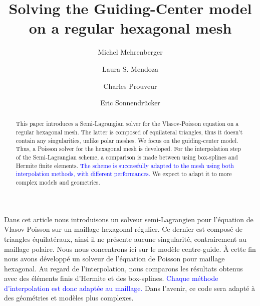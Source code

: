 \documentclass[proc]{edpsmath}
\begin{document}

\title{Solving the Guiding-Center model\\on a regular hexagonal mesh}%
%
\author{Michel Mehrenberger} \address{IRMA, Universit\'e de Strasbourg, 7, rue Ren\'e Descartes, 67084 Strasbourg \& INRIA-Nancy Grand-Est, projet TONUS, 
}
\author{Laura S. Mendoza} \address{Max-Planck-Institut f\"{u}r Plasmaphysik, Boltzmannstr. 2, D-85748 Garching bei M\"unchen, Germany. } 
\author{Charles Prouveur}\address{Universit\'e de Lyon, UMR5208, Institut Camille Jordan,
43 boulevard 11 novembre 1918, F-69622 Villeurbanne cedex,  FRANCE}
\author{Eric Sonnendr\"{u}cker}
%
%


\begin{abstract} 
This paper introduces a Semi-Lagrangian solver for the Vlasov-Poisson equation on a regular hexagonal mesh. The latter is composed of equilateral triangles, thus it doesn't contain any singularities, unlike polar meshes. We focus on the guiding-center model. Thus, a Poisson solver for the hexagonal mesh is developed. For the interpolation step of the Semi-Lagrangian scheme, a comparison is made between using box-splines and Hermite finite elements. \textcolor{blue}{The scheme is successfully adapted to the mesh using both interpolation methods, with different performances.} We expect to adapt it to more complex models and geometries.
\end{abstract}

\begin{resume} 
Dans cet article nous introduisons un solveur semi-Lagrangien pour l'\'equation de Vlasov-Poisson sur un maillage hexagonal r\'egulier. Ce dernier est compos\'e de triangles \'equilat\'eraux, ainsi il ne pr\'esente aucune singularit\'e, contrairement au maillage polaire. Nous nous concentrons ici sur le mod\`ele centre-guide. \`A cette fin nous avons d\'evelopp\'e un solveur de l'\'equation de Poisson pour maillage hexagonal. Au regard de l'interpolation, nous comparons les r\'esultats obtenus avec des \'el\'ements finis d'Hermite et des box-splines. \textcolor{blue}{Chaque m\'ethode d'interpolation est donc adapt\'ee au maillage.}  Dans l'avenir, ce code sera adapt\'e \`a des g\'eom\'etries et mod\`eles plus complexes.  
\end{resume}
\end{document}
